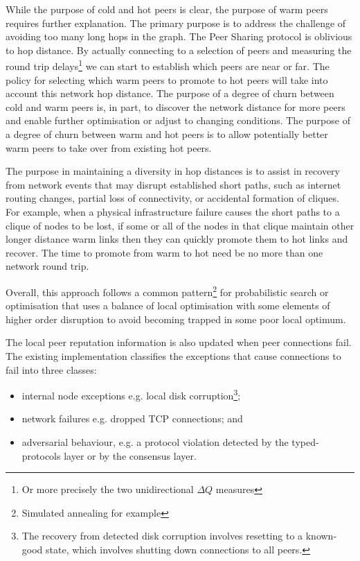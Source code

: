 \documentclass[11pt,a4paper]{article}
\begin{document}
While the purpose of cold and hot peers is clear, the purpose of warm
peers requires further explanation. The primary purpose is to address
the challenge of avoiding too many long hops in the graph. The Peer
Sharing protocol is oblivious to hop distance. By actually connecting to a
selection of peers and measuring the round trip delays\footnote{Or more
  precisely the two unidirectional $\Delta{}Q$ measures} we can start to
establish which peers are near or far. The policy for selecting which
warm peers to promote to hot peers will take into account this network
hop distance. The purpose of a degree of churn between cold and warm
peers is, in part, to discover the network distance for more peers and
enable further optimisation or adjust to changing conditions. The
purpose of a degree of churn between warm and hot peers is to allow
potentially better warm peers to take over from existing hot peers.

The purpose in maintaining a diversity in hop distances is to assist in
recovery from network events that may disrupt established short paths,
such as internet routing changes, partial loss of connectivity, or
accidental formation of cliques. For example, when a physical
infrastructure failure causes the short paths to a clique of nodes to be
lost, if some or all of the nodes in that clique maintain other longer
distance warm links then they can quickly promote them to hot links and
recover. The time to promote from warm to hot need be no more than one
network round trip.

Overall, this approach follows a common pattern\footnote{Simulated
  annealing for example} for probabilistic search or optimisation that
uses a balance of local optimisation with some elements of higher order
disruption to avoid becoming trapped in some poor local optimum.

The local peer reputation information is also updated when peer
connections fail. The existing implementation classifies the exceptions
that cause connections to fail into three classes:

\begin{itemize}
\item
  internal node exceptions e.g. local disk corruption\footnote{The
    recovery from detected disk corruption involves resetting to a
    known-good state, which involves shutting down connections to all
    peers.};
\item
  network failures e.g. dropped TCP connections; and
\item
  adversarial behaviour, e.g. a protocol violation detected by the
  typed-protocols layer or by the consensus layer.
\end{itemize}
\end{document}
